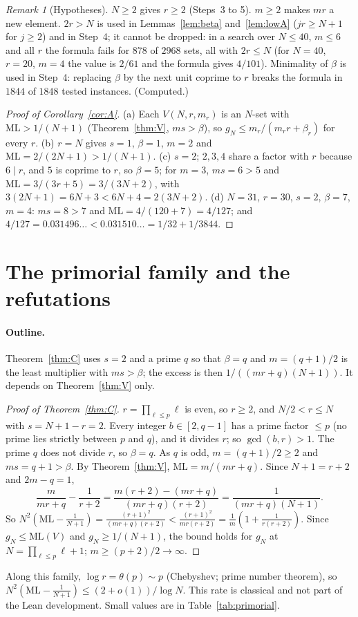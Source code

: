 \documentclass[11pt]{article}
\theoremstyle{definition}
\theoremstyle{remark}
\newtheorem{remark}[theorem]{Remark}
\newcommand{\ML}{\mathrm{ML}}
\begin{document}
\begin{remark}[Hypotheses]\label{rem:hyp}
$N\ge2$ gives $r\ge2$ (Steps~3 to 5). $m\ge2$ makes $mr$ a new element. $2r>N$ is used in Lemmas~\ref{lem:beta} and~\ref{lem:lowA} ($jr\ge N+1$ for $j\ge2$) and in Step~4; it cannot be dropped: in a search over $N\le40$, $m\le6$ and all $r$ the formula fails for $878$ of $2968$ sets, all with $2r\le N$ (for $N=40$, $r=20$, $m=4$ the value is $2/61$ and the formula gives $4/101$). Minimality of $\beta$ is used in Step~4: replacing $\beta$ by the next unit coprime to $r$ breaks the formula in $1844$ of $1848$ tested instances. (Computed.)
\end{remark}

\begin{proof}[Proof of Corollary~\ref{cor:A}]
(a) Each $V(N,r,m_r)$ is an $N$-set with $\ML>1/(N+1)$ (Theorem~\ref{thm:V}, $ms>\beta$), so $g_N\le m_r/(m_rr+\beta_r)$ for every $r$. (b) $r=N$ gives $s=1$, $\beta=1$, $m=2$ and $\ML=2/(2N+1)>1/(N+1)$. (c) $s=2$; $2,3,4$ share a factor with $r$ because $6\mid r$, and $5$ is coprime to $r$, so $\beta=5$; for $m=3$, $ms=6>5$ and $\ML=3/(3r+5)=3/(3N+2)$, with $3(2N+1)=6N+3<6N+4=2(3N+2)$. (d) $N=31$, $r=30$, $s=2$, $\beta=7$, $m=4$: $ms=8>7$ and $\ML=4/(120+7)=4/127$; and $4/127=0.031496\ldots<0.031510\ldots=1/32+1/3844$.
\end{proof}


\section{The primorial family and the refutations}\label{sec:C}

\paragraph{Outline.}
Theorem~\ref{thm:C} uses $s=2$ and a prime $q$ so that $\beta=q$ and $m=(q+1)/2$ is the least multiplier with $ms>\beta$; the excess is then $1/((mr+q)(N+1))$. It depends on Theorem~\ref{thm:V} only.

\begin{proof}[Proof of Theorem~\ref{thm:C}]
$r=\prod_{\ell\le p}\ell$ is even, so $r\ge2$, and $N/2<r\le N$ with $s=N+1-r=2$. Every integer $b\in[2,q-1]$ has a prime factor $\le p$ (no prime lies strictly between $p$ and $q$), and it divides $r$; so $\gcd(b,r)>1$. The prime $q$ does not divide $r$, so $\beta=q$. As $q$ is odd, $m=(q+1)/2\ge2$ and $ms=q+1>\beta$. By Theorem~\ref{thm:V}, $\ML=m/(mr+q)$. Since $N+1=r+2$ and $2m-q=1$,
\[
\frac m{mr+q}-\frac1{r+2}=\frac{m(r+2)-(mr+q)}{(mr+q)(r+2)}=\frac1{(mr+q)(N+1)}.
\]
So $N^2(\ML-\frac1{N+1})=\frac{(r+1)^2}{(mr+q)(r+2)}<\frac{(r+1)^2}{mr(r+2)}=\frac1m(1+\frac1{r(r+2)})$. Since $g_N\le\ML(V)$ and $g_N\ge1/(N+1)$, the bound holds for $g_N$ at $N=\prod_{\ell\le p}\ell+1$; $m\ge(p+2)/2\to\infty$.
\end{proof}
Along this family, $\log r=\theta(p)\sim p$ (Chebyshev; prime number theorem), so $N^2(\ML-\frac1{N+1})\le(2+o(1))/\log N$. This rate is classical and not part of the Lean development. Small values are in Table~\ref{tab:primorial}.
\end{document}
